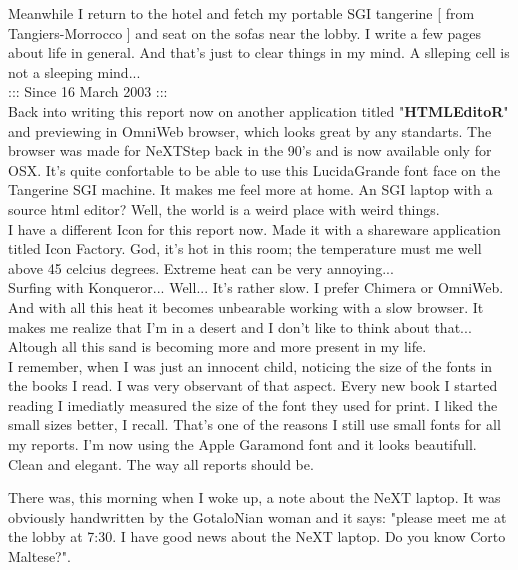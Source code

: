 \documentclass[11pt,twoside,a4paper]{book}
\begin{document}
\begin{multicols*}{2}
Meanwhile I return to the hotel and fetch my portable SGI tangerine [ from Tangiers-Morrocco ] and seat on the sofas near the lobby. I write a few pages about life in general. And that's just to clear things in my mind. A slleping cell is not a sleeping mind... ~\\

{\large ::: Since 16 March 2003 :::} ~\\

Back into writing this report now on another application titled "\textbf{HTMLEditoR}" and previewing in OmniWeb browser, which looks great by any standarts. The browser was made for NeXTStep back in the 90's and is now available only for OSX. It's quite confortable to be able to use this LucidaGrande font face on the Tangerine SGI machine. It makes me feel more at home. An SGI laptop with a source html editor? Well, the world is a weird place with weird things. ~\\

I have a different Icon for this report now. Made it with a shareware application titled Icon Factory. God, it's hot in this room; the temperature must me well above 45 celcius degrees. Extreme heat can be very annoying... ~\\

Surfing with Konqueror... Well... It's rather slow. I prefer Chimera or OmniWeb. And with all this heat it becomes unbearable working with a slow browser. It makes me realize that I'm in a desert and I don't like to think about that... Altough all this sand is becoming more and more present in my life. ~\\

I remember, when I was just an innocent child, noticing the size of the fonts in the books I read. I was very observant of that aspect. Every new book I started reading I imediatly measured the size of the font they used for print. I liked the small sizes better, I recall. That's one of the reasons I still use small fonts for all my reports. I'm now using the Apple Garamond font and it looks beautifull. Clean and elegant. The way all reports should be. ~\\

\vfill
\columnbreak

There was, this morning when I woke up, a note about the NeXT laptop. It was obviously handwritten by the GotaloNian woman and it says: "please meet me at the lobby at 7:30. I have good news about the NeXT laptop. Do you know Corto Maltese?". ~\\


\end{multicols*}
\end{document}

